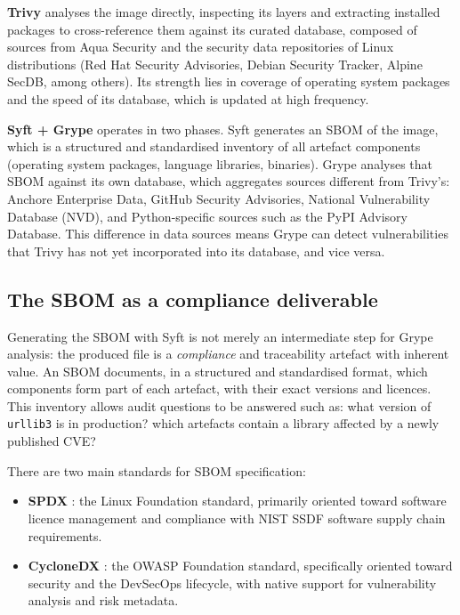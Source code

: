 \textbf{Trivy} \cite{trivy_docs} analyses the image directly, inspecting its layers and extracting installed packages to cross-reference them against its curated database, composed of sources from Aqua Security and the security data repositories of Linux distributions (Red Hat Security Advisories, Debian Security Tracker, Alpine SecDB, among others). Its strength lies in coverage of operating system packages and the speed of its database, which is updated at high frequency.

\textbf{Syft + Grype} operates in two phases. Syft \cite{syft_docs} generates an SBOM of the image, which is a structured and standardised inventory of all artefact components (operating system packages, language libraries, binaries). Grype \cite{grype_docs} analyses that SBOM against its own database, which aggregates sources different from Trivy's: Anchore Enterprise Data, GitHub Security Advisories, National Vulnerability Database (NVD), and Python-specific sources such as the PyPI Advisory Database. This difference in data sources means Grype can detect vulnerabilities that Trivy has not yet incorporated into its database, and vice versa.

\subsection{The SBOM as a compliance deliverable}

Generating the SBOM with Syft is not merely an intermediate step for Grype analysis: the produced file is a \textit{compliance} and traceability artefact with inherent value. An SBOM documents, in a structured and standardised format, which components form part of each artefact, with their exact versions and licences. This inventory allows audit questions to be answered such as: what version of \texttt{urllib3} is in production? which artefacts contain a library affected by a newly published CVE?

There are two main standards for SBOM specification:

\begin{itemize}
  \item \textbf{SPDX} \cite{spdx_spec}: the Linux Foundation standard, primarily oriented toward software licence management and compliance with NIST SSDF \cite{nist_ssdf} software supply chain requirements.
  \item \textbf{CycloneDX} \cite{cyclonedx_spec}: the OWASP Foundation standard, specifically oriented toward security and the DevSecOps lifecycle, with native support for vulnerability analysis and risk metadata.
\end{itemize}

